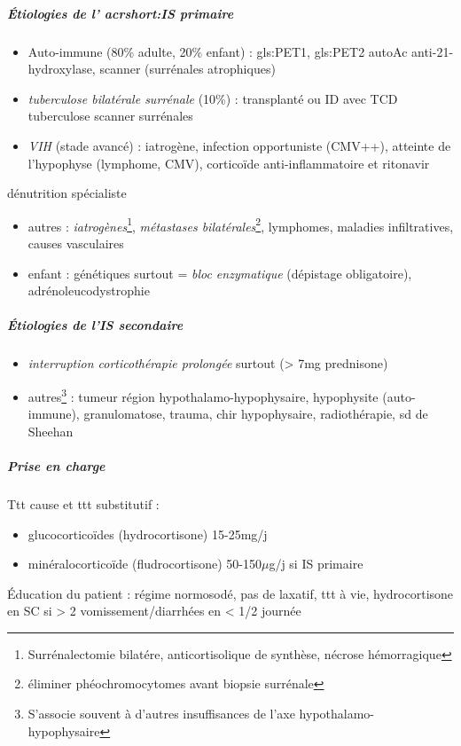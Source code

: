 \documentclass[11pt]{article}
\begin{document}
\subparagraph{Étiologies de l' acrshort:IS primaire}
\label{sec:org111c8c1}
\begin{itemize}
\item Auto-immune (80\% adulte, 20\% enfant) : gls:PET1, gls:PET2 \thus autoAc anti-21-hydroxylase, scanner (surrénales atrophiques)
\item \emph{tuberculose bilatérale surrénale} (10\%) : transplanté ou ID avec TCD tuberculose
\thus scanner surrénales
\item \emph{VIH} (stade avancé) : iatrogène, infection opportuniste (CMV++), atteinte de
l'hypophyse (lymphome, CMV), corticoïde anti-inflammatoire et ritonavir
\end{itemize}
\danger dénutrition \thus spécialiste
\begin{itemize}
\item autres : \emph{iatrogènes}\footnote{Surrénalectomie bilatére, anticortisolique de synthèse, nécrose hémorragique}, \emph{métastases bilatérales}\footnote{\danger éliminer phéochromocytomes avant biopsie surrénale}, lymphomes, maladies
infiltratives, causes vasculaires
\item enfant : génétiques surtout = \emph{bloc enzymatique} (dépistage obligatoire), adrénoleucodystrophie
\end{itemize}

\subparagraph{Étiologies de l'IS secondaire}
\label{sec:org1584b47}
\begin{itemize}
\item \emph{interruption corticothérapie prolongée} surtout (> 7mg prednisone)
\item autres\footnote{S'associe souvent à d'autres insuffisances de l'axe hypothalamo-hypophysaire} : tumeur région hypothalamo-hypophysaire, hypophysite (auto-immune),
granulomatose, trauma, chir hypophysaire, radiothérapie, sd de Sheehan
\end{itemize}

\subparagraph{Prise en charge}
\label{sec:org4830c2e}
Ttt cause et ttt substitutif :
\begin{itemize}
\item glucocorticoïdes (hydrocortisone) 15-25mg/j
\item minéralocorticoïde (fludrocortisone) 50-150\(\mu\)g/j si IS primaire
\end{itemize}

Éducation du patient : régime normosodé, pas de laxatif, ttt à vie, hydrocortisone en SC si > 2 vomissement/diarrhées en < 1/2 journée
\end{document}
